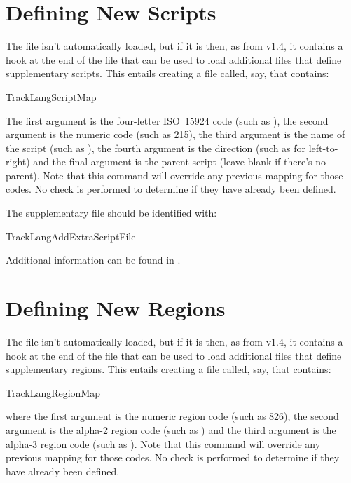 \documentclass[titlepage=false,oneside,
 fontsize=12pt,captions=tableheading]{scrbook}
\begin{document}
\section{Defining New Scripts}
\label{sec:newscripts}

The  file isn't automatically loaded,
but if it is then, as from v1.4, it contains a hook at the end of
the file that can be used to load additional files that define
supplementary scripts. This entails creating a file called, say,
 that contains:
\begin{compactcodebox*}
\gls{TrackLangScriptMap}
\end{compactcodebox*}
The first argument  is the four-letter ISO~15924 code (such as
), the second argument is the numeric code (such as
215), the third argument  is the name of the script (such
as ), the fourth argument is the direction (such as
 for left-to-right) and the final argument is the parent
script (leave blank if there's no parent). Note that this command will override any previous
mapping for those codes. No check is performed to determine if they
have already been defined.

The supplementary file should be identified with:
\begin{compactcodebox*}
\gls{TrackLangAddExtraScriptFile}
\end{compactcodebox*}

Additional information can be found in .

\section{Defining New Regions}
\label{sec:newregions}

The  file isn't automatically loaded,
but if it is then, as from v1.4, it contains a hook at the end of
the file that can be used to load additional files that define
supplementary regions. This entails creating a file called, say,
 that contains:
\begin{compactcodebox*}
\gls{TrackLangRegionMap}
\end{compactcodebox*}
where the first argument is the numeric region code (such as 826),
the second argument is the alpha-2 region code (such as )
and the third argument is the alpha-3 region code (such as
). Note that this command will override any previous
mapping for those codes. No check is performed to determine if they
have already been defined.
\end{document}
